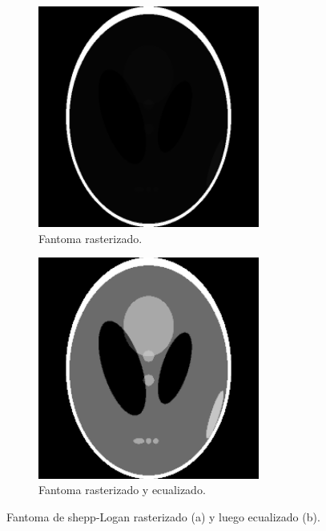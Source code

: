 \documentclass[letterpaper,12pt]{article}
\theoremstyle{plain}
\begin{document}
\begin{figure}[H]
   \centering
        \begin{subfigure}[h]{0.49\linewidth}
           \centering
           \includegraphics[width=0.8\textwidth]{Figuras/SL_rasterizado.png}
           \caption{Fantoma rasterizado.} 
           \label{fig:SL_rast}
        \end{subfigure}
        \begin{subfigure}[h]{0.49\linewidth}
           \centering
           \includegraphics[width=0.8\textwidth]{Figuras/SL_rasterizado_EQ.png}
           \caption{Fantoma rasterizado y ecualizado.}
           \label{fig:SL_EQ}
        \end{subfigure}
   \caption{Fantoma de shepp-Logan rasterizado (a) y luego ecualizado (b).}
   \label{fig:SL}
\end{figure}
\end{document}
